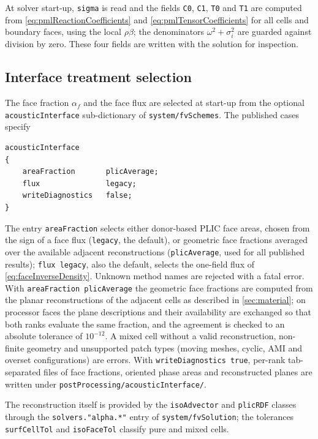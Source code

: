 \documentclass[final,12pt,nopreprintline]{elsarticle}
\newcommand{\code}[1]{\texttt{#1}}
\begin{document}
At solver start-up, \code{sigma} is read and the fields \code{C0}, \code{C1},
\code{T0} and \code{T1} are computed from \cref{eq:pmlReactionCoefficients}
and \cref{eq:pmlTensorCoefficients} for all cells and boundary faces, using
the local $\rho\beta$; the denominators $\omega^2+\sigma_i^2$ are guarded
against division by zero.  These four fields are written with the solution
for inspection.

\subsection{Interface treatment selection}
\label{sec:interfaceSelection}

The face fraction $\alpha_f$ and the face flux are selected at start-up from
the optional \code{acousticInterface} sub-dictionary of \code{system/fvSchemes}.
The published cases specify
\begin{verbatim}
acousticInterface
{
    areaFraction       plicAverage;
    flux               legacy;
    writeDiagnostics   false;
}
\end{verbatim}
The entry \code{areaFraction} selects either donor-based PLIC face areas,
chosen from the sign of a face flux (\code{legacy}, the default), or geometric
face fractions averaged over the available adjacent reconstructions
(\code{plicAverage}, used for all published results); \code{flux legacy}, also
the default, selects the one-field flux of \cref{eq:faceInverseDensity}.
Unknown method names are rejected with a fatal error.  With
\code{areaFraction plicAverage} the geometric face
fractions are computed from the planar reconstructions of the adjacent cells
as described in \cref{sec:material}; on processor faces the plane
descriptions and their availability are exchanged so that both ranks evaluate
the same fraction, and the agreement is checked to an absolute tolerance of
$10^{-12}$.  A mixed cell without a valid reconstruction, non-finite geometry
and unsupported patch types (moving meshes, cyclic, AMI and overset
configurations) are errors.  With \code{writeDiagnostics true}, per-rank
tab-separated files of face fractions, oriented phase areas and reconstructed
planes are written under \code{postProcessing/acousticInterface/}.

The reconstruction itself is provided by the \code{isoAdvector} and
\code{plicRDF} classes \cite{Roenby2016,Scheufler2019} through the
\code{solvers."alpha.*"} entry of \code{system/fvSolution}; the tolerances
\code{surfCellTol} and \code{isoFaceTol} classify pure and mixed cells.
\end{document}
